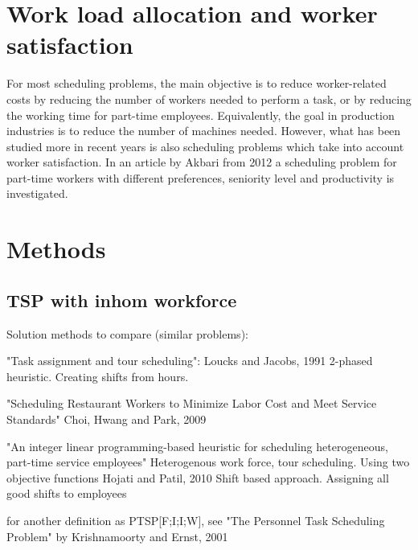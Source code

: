 %

\section{Work load allocation and worker satisfaction} \label{WLA}
For most scheduling problems, the main objective is to reduce worker-related costs by reducing the number of workers needed to perform a task, or by reducing the working time for part-time employees. Equivalently, the goal in production industries is to reduce the number of machines needed. However, what has been studied more in recent years is also scheduling problems which take into account worker satisfaction. In an article by Akbari from 2012 a scheduling problem for part-time workers with different preferences, seniority level and productivity is investigated. \cite{akbari_2012}

%
%
%


\section{Methods}
\subsection{TSP with inhom workforce}

Solution methods to compare (similar problems):

"Task assignment and tour scheduling": Loucks and Jacobs, 1991
2-phased heuristic. Creating shifts from hours.


"Scheduling Restaurant Workers to Minimize Labor Cost and Meet Service Standards" Choi, Hwang and Park, 2009

"An integer linear programming-based heuristic for scheduling heterogeneous, part-time service employees" Heterogenous work force, tour scheduling. Using two objective functions Hojati and Patil, 2010 
Shift based approach. Assigning all good shifts to employees

for another definition as PTSP[F;I;I;W], see "The Personnel Task Scheduling Problem" by Krishnamoorty and Ernst, 2001



